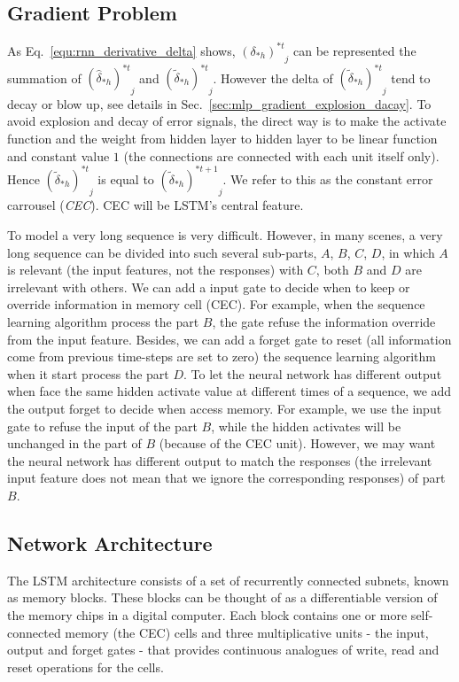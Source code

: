\documentclass[runningheads,openany]{xhlPaper}
\begin{document}
\subsection{Gradient Problem}
As Eq.~\ref{equ:rnn_derivative_delta} shows, ${\left( {{\delta _{*h}}} \right)^{*t}}_j$ can be represented the summation of ${\left( {{{\hat \delta }_{*h}}} \right)^{*t}}_j$ and ${\left( {{{\tilde \delta }_{*h}}} \right)^{*t}}_j$. 
However the delta of ${\left( {{{\tilde \delta }_{*h}}} \right)^{*t}}_j$ tend to decay or blow up, see details in Sec.~\ref{sec:mlp_gradient_explosion_dacay}.
To avoid explosion and decay of error signals, the direct way is to make the activate function and the weight from hidden layer to hidden layer to be linear function and constant value $1$ (the connections are connected with each unit itself only). Hence ${\left( {{{\tilde \delta }_{*h}}} \right)^{*t}}_j$ is equal to ${\left( {{{\tilde \delta }_{*h}}} \right)^{*t+1}}_j$.
We refer to this as the constant error carrousel (\emph{CEC}). CEC will be LSTM's central feature.

To model a very long sequence is very difficult. However, in many scenes, a very long sequence can be divided into such several sub-parts, $A$, $B$, $C$, $D$, in which $A$ is relevant (the input features, not the responses) with $C$, both $B$ and $D$ are irrelevant with others.
We can add a input gate to decide when to keep or override information in memory cell (CEC). For example, when the sequence learning algorithm process the part $B$, the gate refuse the information override from the input feature.
Besides, we can add a forget gate to reset (all information come from previous time-steps are set to zero) the sequence learning algorithm when it start process the part $D$.
To let the neural network has different output when face the same hidden activate value at different times of a sequence, we add the output forget to decide when access memory. For example, we use the input gate to refuse the input of the part $B$, while the hidden activates will be unchanged in the part of $B$ (because of the CEC unit). However, we may want the neural network has different output to match the responses (the irrelevant input feature does not mean that we ignore the corresponding responses) of part $B$.

\subsection{Network Architecture}
The LSTM architecture consists of a set of recurrently connected subnets, known as memory blocks.
These blocks can be thought of as a differentiable version of the memory chips in a digital computer.
Each block contains one or more self-connected memory (the CEC) cells and three multiplicative units - the input, output and forget gates - that provides continuous analogues of write, read and reset operations for the cells.
\end{document}
